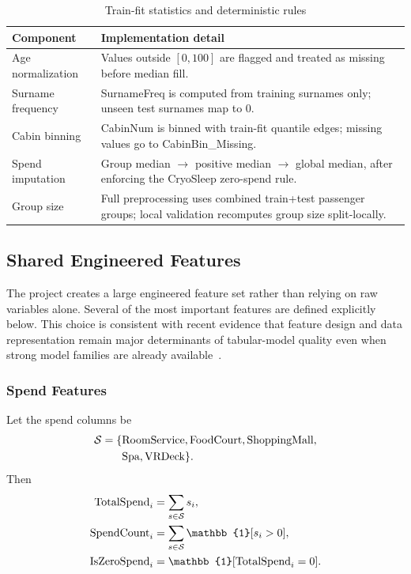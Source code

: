 \documentclass[conference]{IEEEtran}
\renewcommand{\texttt}[1]{\textnormal{#1}}
\begin{document}
\begin{table}[t]
\caption{Train-fit statistics and deterministic rules}
\label{tab:train_fit_rules}
\centering
\begin{tabularx}{\linewidth}{l Y}
\toprule
Component & Implementation detail \\
\midrule
Age normalization & Values outside $[0,100]$ are flagged and treated as missing before median fill. \\
Surname frequency & \texttt{SurnameFreq} is computed from training surnames only; unseen test surnames map to 0. \\
Cabin binning & \texttt{CabinNum} is binned with train-fit quantile edges; missing values go to \texttt{CabinBin\_Missing}. \\
Spend imputation & Group median $\rightarrow$ positive median $\rightarrow$ global median, after enforcing the CryoSleep zero-spend rule. \\
Group size & Full preprocessing uses combined train+test passenger groups; local validation recomputes group size split-locally. \\
\bottomrule
\end{tabularx}
\end{table}

\subsection{Shared Engineered Features}
The project creates a large engineered feature set rather than relying on raw variables alone. Several of the most important features are defined explicitly below. This choice is consistent with recent evidence that feature design and data representation remain major determinants of tabular-model quality even when strong model families are already available~\cite{chicco2022tips,tschalzev2024datacentric,grinsztajn2024betterdefault}.

\subsubsection{Spend Features}
Let the spend columns be
\[
\begin{aligned}
\mathcal{S} = \{&\texttt{RoomService}, \texttt{FoodCourt}, \texttt{ShoppingMall},\\
                &\texttt{Spa}, \texttt{VRDeck}\}.
\end{aligned}
\]
Then
\begin{align}
\texttt{TotalSpend}_i &= \sum_{s \in \mathcal{S}} s_i,\\
\texttt{SpendCount}_i &= \sum_{s \in \mathcal{S}} \mathbb{1}[s_i > 0],\\
\texttt{IsZeroSpend}_i &= \mathbb{1}[\texttt{TotalSpend}_i = 0].
\end{align}
\end{document}
